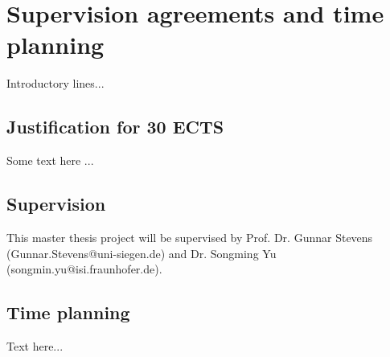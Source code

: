 \chapter{Supervision agreements and time planning} 

Introductory lines...

\section{Justification for 30 ECTS}

Some text here ...

\section{Supervision}

This master thesis project will be supervised by Prof. Dr. Gunnar Stevens (Gunnar.Stevens@uni-siegen.de) and Dr. Songming Yu (songmin.yu@isi.fraunhofer.de).  

\section{Time planning}

Text here...